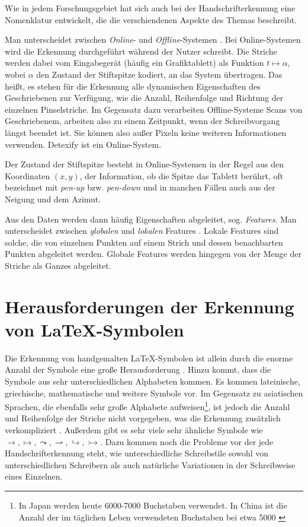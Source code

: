Wie in jedem Forschungsgebiet hat sich auch bei der Handschrifterkennung eine Nomenklatur entwickelt, die die verschiendenen Aspekte des Themas beschreibt.

Man unterscheidet zwischen \emph{Online}- und \emph{Offline}-Systemen \cite{Tappert:1990p10302}. Bei Online-Systemen wird die Erkennung durchgeführt während der Nutzer schreibt. Die Striche werden dabei vom Eingabegerät (häufig ein Grafiktablett) als Funktion $ t \mapsto \alpha $, wobei $\alpha$ den Zustand der Stiftspitze kodiert, an das System übertragen. Das heißt, es stehen für die Erkennung alle dynamischen Eigenschaften des Geschriebenen zur Verfügung, wie die Anzahl, Reihenfolge und Richtung der einzelnen Pinselstriche. Im Gegensatz dazu verarbeiten Offline-Systeme Scans von Geschriebenem, arbeiten also zu einem Zeitpunkt, wenn der Schreibvorgang längst beendet ist. Sie können also außer Pixeln keine weiteren Informationen verwenden.
Detexify ist ein Online-System.

Der Zustand der Stiftspitze besteht in Online-Systemen in der Regel aus den Koordinaten $(x,y)$, der Information, ob die Spitze das Tablett berührt, oft bezeichnet mit \emph{pen-up} bzw. \emph{pen-down} und in manchen Fällen auch aus der Neigung und dem Azimut.

Aus den Daten werden dann häufig Eigenschaften abgeleitet, sog. \emph{Features}. Man unterscheidet zwischen \emph{globalen} und \emph{lokalen} Features \cite{Tapia:2007p9160}. Lokale Features sind solche, die von einzelnen Punkten auf einem Strich und dessen benachbarten Punkten abgeleitet werden. Globale Features werden hingegen von der Menge der Striche als Ganzes abgeleitet.

\section[Herausforderungen]{Herausforderungen der Erkennung von \LaTeX-Symbolen}
Die Erkennung von handgemalten \LaTeX-Symbolen ist allein durch die enorme Anzahl der Symbole eine große Herausforderung \cite{Koerich:2003p1562}. Hinzu kommt, dass die Symbole aus sehr unterschiedlichen Alphabeten kommen. Es kommen lateinische, griechische, mathematische und weitere Symbole vor. Im Gegensatz zu asiatischen Sprachen, die ebenfalls sehr große Alphabete aufweisen\footnote{In Japan werden heute 6000-7000 Buchstaben verwendet. In China ist die Anzahl der im täglichen Leben verwendeten Buchstaben bei etwa 5000 \cite{Jaeger:2003p1097}}, ist jedoch die Anzahl und Reihenfolge der Striche nicht vorgegeben, was die Erkennung zusätzlich verkompliziert \cite{Watt:2005p1816}. Außerdem gibt es sehr viele sehr ähnliche Symbole wie $\rightarrow,\mapsto,\leadsto,\rightharpoonup,\hookrightarrow,\rightarrowtail$. Dazu kommen noch die Probleme vor der jede Handschrifterkennung steht, wie unterschiedliche Schreibstile sowohl von unterschiedlichen Schreibern als auch natürliche Variationen in der Schreibweise eines Einzelnen.

